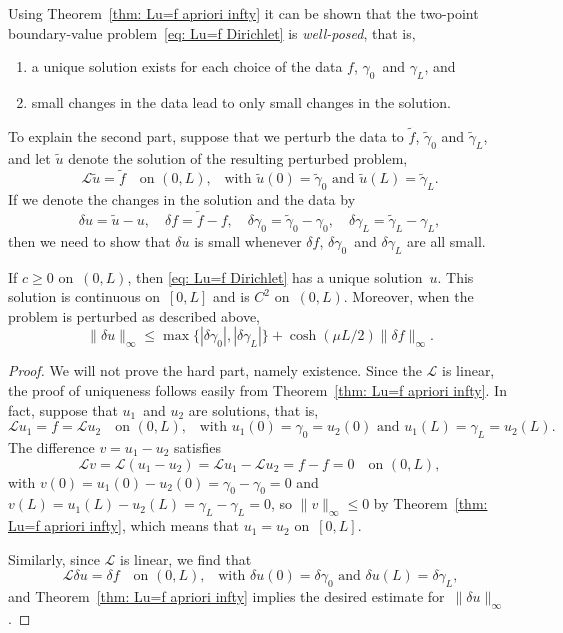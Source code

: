 Using Theorem~\ref{thm: Lu=f apriori infty} it can be shown that
the two-point boundary-value problem~\eqref{eq: Lu=f Dirichlet} is 
\emph{well-posed}, that is, 
\begin{enumerate}
\item a unique solution exists for each choice of the data $f$, $\gamma_0$~and 
$\gamma_L$, and 
\item small changes in the data lead to only small changes in the solution.
\end{enumerate}
To explain the second part, suppose that we perturb the data to $\tilde f$, 
$\tilde\gamma_0$ and $\tilde\gamma_L$, and let $\tilde u$ denote the solution 
of the resulting perturbed problem,
\[
\mathcal{L}\tilde u=\tilde f\quad\text{on $(0,L)$,}
    \quad\text{with $\tilde u(0)=\tilde\gamma_0$ 
and $\tilde u(L)=\tilde\gamma_L$.}
\]
If we denote the changes in the solution and the data by
\[
\delta u=\tilde u-u,\quad\delta f=\tilde f-f,\quad
\delta\gamma_0=\tilde\gamma_0-\gamma_0,\quad
\delta\gamma_L=\tilde\gamma_L-\gamma_L,
\]
then we need to show that $\delta u$ is small whenever $\delta f$, 
$\delta\gamma_0$~and $\delta\gamma_L$ are all small.

\begin{theorem}
If $c\ge0$ on~$(0,L)$, then \eqref{eq: Lu=f Dirichlet} has a unique 
solution~$u$.  This solution is continuous on~$[0,L]$ and is $C^2$ on~$(0,L)$.
Moreover, when the problem is perturbed as described above, 
\[
\|\delta u\|_\infty\le\max\{|\delta\gamma_0|,|\delta\gamma_L|\}
    +\cosh(\mu L/2)\|\delta f\|_\infty.
\]
\end{theorem}
\begin{proof}
We will not prove the hard part, namely existence.  Since the $\mathcal{L}$ is 
linear, the proof of uniqueness follows easily from 
Theorem~\ref{thm: Lu=f apriori infty}.  In fact, suppose that $u_1$~and $u_2$ 
are solutions, that is,
\[
\mathcal{L}u_1=f=\mathcal{L}u_2\quad\text{on $(0,L)$,}
    \quad\text{with $u_1(0)=\gamma_0=u_2(0)$ and $u_1(L)=\gamma_L=u_2(L)$.}
\]
The difference $v=u_1-u_2$ satisfies
\[
\mathcal{L}v=\mathcal{L}(u_1-u_2)=\mathcal{L}u_1-\mathcal{L}u_2=f-f=0
    \quad\text{on $(0,L)$},
\]
with $v(0)=u_1(0)-u_2(0)=\gamma_0-\gamma_0=0$ and
$v(L)=u_1(L)-u_2(L)=\gamma_L-\gamma_L=0$, so $\|v\|_\infty\le0$ by 
Theorem~\ref{thm: Lu=f apriori infty}, which means that $u_1=u_2$ on~$[0,L]$.

Similarly, since $\mathcal{L}$ is linear, we find that
\[
\mathcal{L}\delta u=\delta f\quad\text{on $(0,L)$,}
    \quad\text{with $\delta u(0)=\delta\gamma_0$ 
and $\delta u(L)=\delta\gamma_L$,}
\]
and Theorem~\ref{thm: Lu=f apriori infty} implies the desired estimate 
for~$\|\delta u\|_\infty$.
\end{proof}

